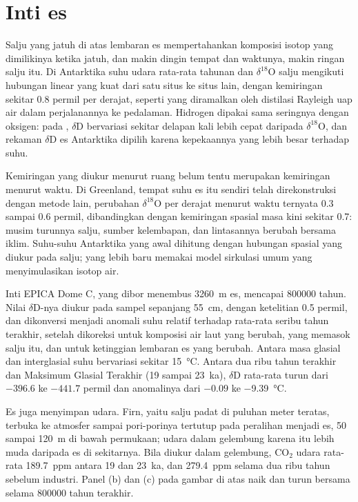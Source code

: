 \section{Inti es}\label{sec:b2:climate-proxies:ice}

Salju yang jatuh di atas lembaran es mempertahankan komposisi isotop yang dimilikinya ketika jatuh, dan
makin dingin tempat dan waktunya, makin ringan salju itu. Di Antarktika suhu udara rata-rata tahunan dan
$\delta^{18}$O salju mengikuti hubungan linear yang kuat dari satu situs ke situs lain, dengan
kemiringan sekitar \num{0.8} permil per derajat, seperti yang diramalkan oleh distilasi Rayleigh uap air dalam perjalanannya
ke pedalaman. Hidrogen dipakai sama seringnya dengan oksigen: pada , $\delta$D bervariasi sekitar delapan kali lebih cepat daripada $\delta^{18}$O, dan
rekaman $\delta$D es Antarktika dipilih karena kepekaannya yang lebih besar terhadap suhu.

Kemiringan yang diukur menurut ruang belum tentu merupakan kemiringan menurut waktu. Di Greenland, tempat suhu
es itu sendiri telah direkonstruksi dengan metode lain, perubahan $\delta^{18}$O per derajat
menurut waktu ternyata 0.3 sampai \num{0.6} permil, dibandingkan dengan kemiringan spasial masa kini sekitar
\num{0.7}: musim turunnya salju, sumber kelembapan, dan lintasannya berubah bersama
iklim. Suhu-suhu Antarktika yang awal dihitung dengan hubungan spasial yang diukur pada
salju; yang lebih baru memakai model sirkulasi umum yang menyimulasikan isotop air.

Inti EPICA Dome C, yang dibor menembus \qty{3260}{m} es, mencapai \num{800000} tahun. Nilai
$\delta$D-nya diukur pada sampel sepanjang \qty{55}{cm}, dengan ketelitian \num{0.5} permil, dan
dikonversi menjadi anomali suhu relatif terhadap rata-rata seribu tahun terakhir, setelah
dikoreksi untuk komposisi air laut yang berubah, yang memasok salju itu, dan untuk ketinggian
lembaran es yang berubah. Antara masa glasial dan interglasial suhu bervariasi sekitar
\qty{15}{\celsius}. Antara dua ribu tahun terakhir dan Maksimum Glasial Terakhir (\num{19} sampai
\qty{23}{ka}), $\delta$D rata-rata turun dari $-396.6$ ke $-441.7$ permil dan anomalinya dari
$-0.09$ ke \qty{-9.39}{\celsius}.

Es juga menyimpan udara. Firn, yaitu salju padat di puluhan meter teratas, terbuka ke
atmosfer sampai pori-porinya tertutup pada peralihan menjadi es, 50 sampai \qty{120}{m} di bawah permukaan; udara
dalam gelembung karena itu lebih muda daripada es di sekitarnya. Bila diukur dalam gelembung, CO$_2$
udara rata-rata \qty{189.7}{ppm} antara \num{19} dan \qty{23}{ka}, dan \qty{279.4}{ppm} selama
dua ribu tahun sebelum industri. Panel (b) dan (c) pada gambar di atas naik dan turun
bersama selama \num{800000} tahun terakhir.

